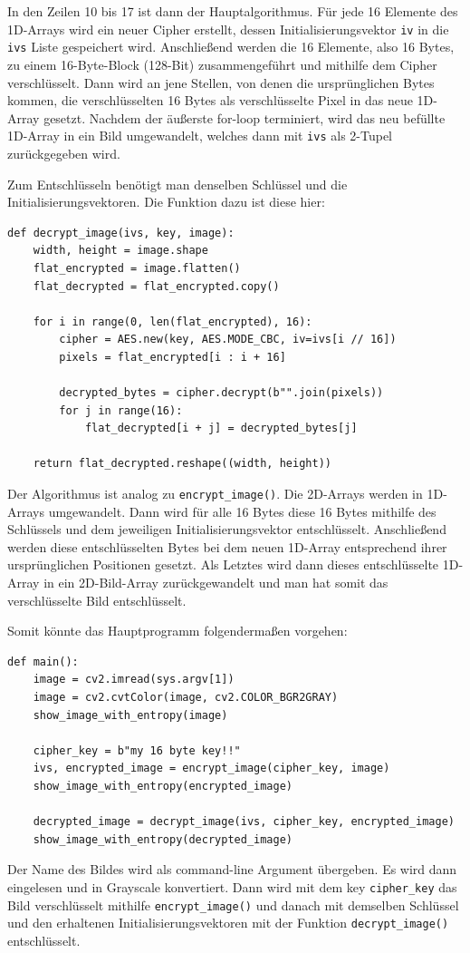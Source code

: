 In den Zeilen 10 bis 17 ist dann der Hauptalgorithmus. Für jede 16 Elemente des 1D-Arrays wird ein neuer Cipher erstellt,
dessen Initialisierungsvektor \lstinline{iv} in die \lstinline{ivs} Liste gespeichert wird. Anschließend werden die 16 Elemente,
also 16 Bytes, zu einem 16-Byte-Block (128-Bit) zusammengeführt und mithilfe dem Cipher verschlüsselt.
Dann wird an jene Stellen, von denen die ursprünglichen Bytes kommen, die verschlüsselten
16 Bytes als verschlüsselte Pixel in das neue 1D-Array gesetzt. Nachdem der äußerste for-loop terminiert, wird das neu befüllte 1D-Array in ein
Bild umgewandelt, welches dann mit \lstinline{ivs} als 2-Tupel zurückgegeben wird.

Zum Entschlüsseln benötigt man denselben Schlüssel und die Initialisierungsvektoren. Die Funktion dazu ist diese hier:
\begin{lstlisting}
def decrypt_image(ivs, key, image):
    width, height = image.shape
    flat_encrypted = image.flatten()
    flat_decrypted = flat_encrypted.copy()

    for i in range(0, len(flat_encrypted), 16):
        cipher = AES.new(key, AES.MODE_CBC, iv=ivs[i // 16])
        pixels = flat_encrypted[i : i + 16]

        decrypted_bytes = cipher.decrypt(b"".join(pixels))
        for j in range(16):
            flat_decrypted[i + j] = decrypted_bytes[j]

    return flat_decrypted.reshape((width, height))
\end{lstlisting}
Der Algorithmus ist analog zu \lstinline{encrypt_image()}. Die 2D-Arrays werden in 1D-Arrays umgewandelt. Dann wird für alle
16 Bytes diese 16 Bytes mithilfe des Schlüssels und dem jeweiligen Initialisierungsvektor entschlüsselt. Anschließend werden diese entschlüsselten Bytes
bei dem neuen 1D-Array entsprechend ihrer ursprünglichen Positionen gesetzt. Als Letztes wird dann dieses entschlüsselte 1D-Array
in ein 2D-Bild-Array zurückgewandelt und man hat somit das verschlüsselte Bild entschlüsselt.

Somit könnte das Hauptprogramm folgendermaßen vorgehen:
\begin{lstlisting}
def main():
    image = cv2.imread(sys.argv[1])
    image = cv2.cvtColor(image, cv2.COLOR_BGR2GRAY)
    show_image_with_entropy(image)

    cipher_key = b"my 16 byte key!!"
    ivs, encrypted_image = encrypt_image(cipher_key, image)
    show_image_with_entropy(encrypted_image)

    decrypted_image = decrypt_image(ivs, cipher_key, encrypted_image)
    show_image_with_entropy(decrypted_image)
\end{lstlisting}
Der Name des Bildes wird als command-line Argument übergeben. Es wird dann eingelesen und in Grayscale konvertiert.
Dann wird mit dem key \lstinline{cipher_key} das Bild verschlüsselt mithilfe \lstinline{encrypt_image()} und danach
mit demselben Schlüssel und den erhaltenen Initialisierungsvektoren mit der Funktion \lstinline{decrypt_image()} entschlüsselt.

